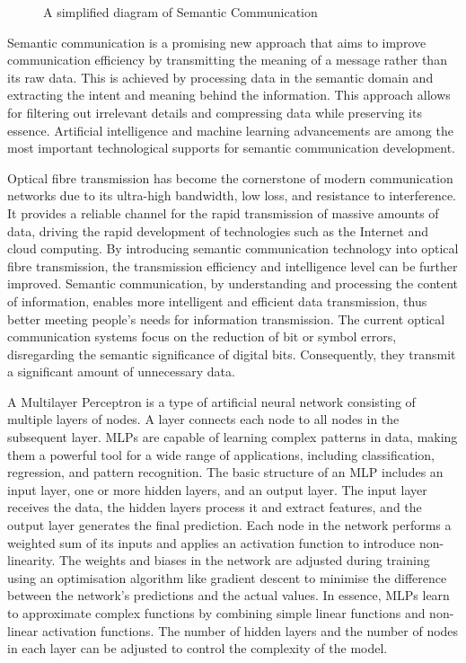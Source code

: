 \documentclass[journal]{IEEEtran}
\begin{document}
\begin{figure}[t]
    \centering
    
    \caption{A simplified diagram of Semantic Communication}
    \label{Semantic}
\end{figure}

Semantic communication is a promising new approach that aims to improve communication efficiency by transmitting the meaning of a message rather than its raw data. This is achieved by processing data in the semantic domain and extracting the intent and meaning behind the information. This approach allows for filtering out irrelevant details and compressing data while preserving its essence.
Artificial intelligence and machine learning advancements are among the most important technological supports for semantic communication development.

Optical fibre transmission has become the cornerstone of modern communication networks due to its ultra-high bandwidth, low loss, and resistance to interference. It provides a reliable channel for the rapid transmission of massive amounts of data, driving the rapid development of technologies such as the Internet and cloud computing. By introducing semantic communication technology into optical fibre transmission, the transmission efficiency and intelligence level can be further improved. Semantic communication, by understanding and processing the content of information, enables more intelligent and efficient data transmission, thus better meeting people's needs for information transmission.
The current optical communication systems focus on the reduction of bit or symbol errors, disregarding the semantic significance of digital bits. Consequently, they transmit a significant amount of unnecessary data.

A Multilayer Perceptron is a type of artificial neural network consisting of multiple layers of nodes. A layer connects each node to all nodes in the subsequent layer. MLPs are capable of learning complex patterns in data, making them a powerful tool for a wide range of applications, including classification, regression, and pattern recognition.
The basic structure of an MLP includes an input layer, one or more hidden layers, and an output layer. The input layer receives the data, the hidden layers process it and extract features, and the output layer generates the final prediction. Each node in the network performs a weighted sum of its inputs and applies an activation function to introduce non-linearity. The weights and biases in the network are adjusted during training using an optimisation algorithm like gradient descent to minimise the difference between the network's predictions and the actual values. In essence, MLPs learn to approximate complex functions by combining simple linear functions and non-linear activation functions. The number of hidden layers and the number of nodes in each layer can be adjusted to control the complexity of the model.
\end{document}
